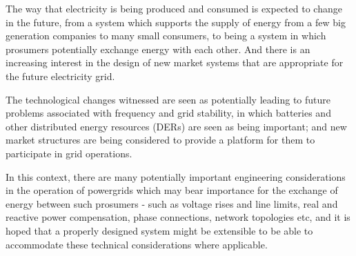 









The way that electricity is being produced and consumed is expected to change in the future, from a system which supports the supply of energy from a few big generation companies to many small consumers, to being a system in which prosumers potentially exchange energy with each other.
And there is an increasing interest in the design of new market systems that are appropriate for the future electricity grid.

The technological changes witnessed are seen as potentially leading to future problems associated with frequency and grid stability, in which batteries and other distributed energy resources (DERs) are seen as being important; and new market structures are being considered to provide a platform for them to participate in grid operations.

In this context, there are many potentially important engineering considerations in the operation of powergrids which may bear importance for the exchange of energy between such prosumers - such as voltage rises and line limits, real and reactive power compensation, phase connections, network topologies etc, and it is hoped that a properly designed system might be extensible to be able to accommodate these technical considerations where applicable.

